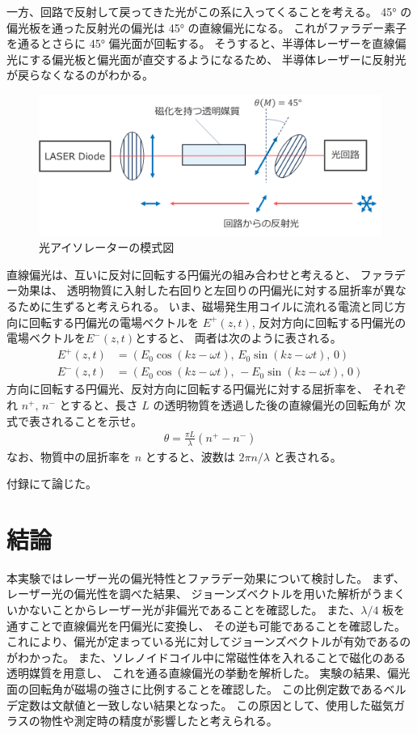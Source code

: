 \documentclass[9pt,dvipdfmx,a4paper]{jsarticle}
\begin{document}
一方、回路で反射して戻ってきた光がこの系に入ってくることを考える。
\ang{45} の偏光板を通った反射光の偏光は \ang{45} の直線偏光になる。
これがファラデー素子を通るとさらに \ang{45} 偏光面が回転する。
そうすると、半導体レーザーを直線偏光にする偏光板と偏光面が直交するようになるため、
半導体レーザーに反射光が戻らなくなるのがわかる。
\begin{figure}[H]
    \centering
    \includegraphics[width=0.7\columnwidth]{fig_assignment-1.png}
    \caption{光アイソレーターの模式図}
    \label{fig:assignment-1}
\end{figure}

\begin{tcolorbox}[colbacktitle=white, coltitle=black, colback=white, title = 課題4]
    直線偏光は、互いに反対に回転する円偏光の組み合わせと考えると、
    ファラデー効果は、
    透明物質に入射した右回りと左回りの円偏光に対する屈折率が異なるために生ずると考えられる。
    いま、磁場発生用コイルに流れる電流と同じ方向に回転する円偏光の電場ベクトルを \(E^+(z,t)\),
    反対方向に回転する円偏光の電場ベクトルを\(E^-(z,t)\)とすると、
    両者は次のように表される。
    \begin{align*}
        E^+(z,t) &= (E_0\cos(kz-\omega t),\,E_0\sin(kz-\omega t),\,0)\\
        E^-(z,t) &= (E_0\cos(kz-\omega t),\,- E_0\sin(kz-\omega t),\,0)
    \end{align*}
    方向に回転する円偏光、反対方向に回転する円偏光に対する屈折率を、
    それぞれ \(n^+,\,n^-\) とすると、長さ \(L\) の透明物質を透過した後の直線偏光の回転角が
    次式で表されることを示せ。
    \begin{align*}
        \theta = \frac{\pi L}{\lambda}(n^+-n^-)
    \end{align*}
    なお、物質中の屈折率を \(n\) とすると、波数は \(2\pi n/\lambda\) と表される。
\end{tcolorbox}

付録にて論じた。

\section{結論}
本実験ではレーザー光の偏光特性とファラデー効果について検討した。
まず、レーザー光の偏光性を調べた結果、
ジョーンズベクトルを用いた解析がうまくいかないことからレーザー光が非偏光であることを確認した。
また、\(\lambda/4\) 板を通すことで直線偏光を円偏光に変換し、
その逆も可能であることを確認した。
これにより、偏光が定まっている光に対してジョーンズベクトルが有効であるのがわかった。
また、ソレノイドコイル中に常磁性体を入れることで磁化のある透明媒質を用意し、
これを通る直線偏光の挙動を解析した。
実験の結果、偏光面の回転角が磁場の強さに比例することを確認した。
この比例定数であるベルデ定数は文献値と一致しない結果となった。
この原因として、使用した磁気ガラスの物性や測定時の精度が影響したと考えられる。
\end{document}
